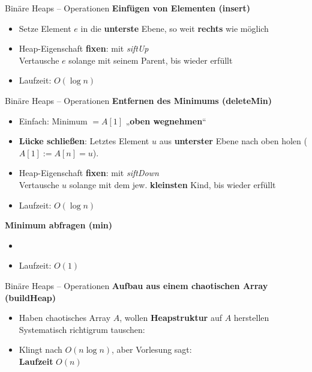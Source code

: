 \begin{frame}{Binäre Heaps – Operationen}
	\textbf{Einfügen von Elementen (insert)} 
	\begin{itemize}
		\item Setze Element $e$ in die \textbf{unterste} Ebene, so weit \textbf{rechts} wie möglich
		\pause
		\item Heap-Eigenschaft \textbf{fixen}: mit \emph{siftUp} \\
		Vertausche $e$ solange mit seinem Parent, bis wieder erfüllt
		\pause
		\item Laufzeit: $O(\log n)$
	\end{itemize}
\end{frame}

\begin{frame}{Binäre Heaps – Operationen}
	\textbf{Entfernen des Minimums (deleteMin)}
	\begin{itemize}
		\item Einfach: Minimum $= A[1]$ „\textbf{oben wegnehmen}“
		\pause
		\item \textbf{Lücke schließen}: Letztes Element $u$ aus \textbf{unterster} Ebene nach oben holen ($A[1] := A[n] = u$).
		\pause
		\item Heap-Eigenschaft \textbf{fixen}: mit \emph{siftDown} \\
		Vertausche $u$ solange mit dem jew. \textbf{kleinsten} Kind, bis wieder erfüllt
		\pause
		\item Laufzeit: $O(\log n)$
		\pause
	\end{itemize}
	\forcenewline
	\textbf{Minimum abfragen (min)}
	\begin{itemize}
		\item {}
		\item Laufzeit: $O(1)$
	\end{itemize}
\end{frame}

\begin{frame}{Binäre Heaps – Operationen}
	\textbf{Aufbau aus einem chaotischen Array (buildHeap)} 
	\begin{itemize}
		\item Haben chaotisches Array $A$, wollen \textbf{Heapstruktur} auf $A$ herstellen
		\implitem Systematisch richtigrum tauschen: \\
		\quad {}
		\qquad {}
		\pause
		\item Klingt nach $O(n \log n)$, aber Vorlesung sagt: \\
		\textbf{Laufzeit} $O(n)$
	\end{itemize}
\end{frame}

